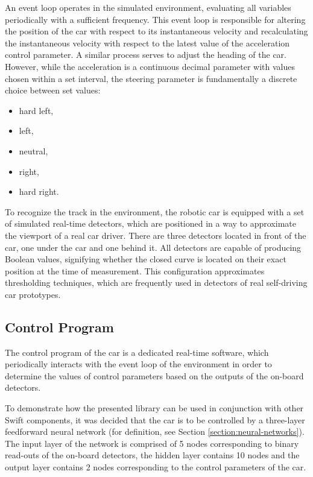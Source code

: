 An event loop operates in the simulated environment, evaluating all variables periodically with a sufficient frequency. This event loop is responsible for altering the position of the car with respect to its instantaneous velocity and recalculating the instantaneous velocity with respect to the latest value of the acceleration control parameter. A similar process serves to adjust the heading of the car. However, while the acceleration is a continuous decimal parameter with values chosen within a set interval, the steering parameter is fundamentally a discrete choice between set values:
~
\begin{itemize}
	\item hard left,
	\item left,
	\item neutral,
	\item right,
	\item hard right.
\end{itemize}

To recognize the track in the environment, the robotic car is equipped with a set of simulated real-time detectors, which are positioned in a way to approximate the viewport of a real car driver. There are three detectors located in front of the car, one under the car and one behind it. All detectors are capable of producing Boolean values, signifying whether the closed curve is located on their exact position at the time of measurement. This configuration approximates thresholding techniques, which are frequently used in detectors of real self-driving car prototypes.

\subsection{Control Program}
The control program of the car is a dedicated real-time software, which periodically interacts with the event loop of the environment in order to determine the values of control parameters based on the outputs of the on-board detectors.

To demonstrate how the presented library can be used in conjunction with other Swift components, it was decided that the car is to be controlled by a three-layer feedforward neural network (for definition, see Section \ref{section:neural-networks}). The input layer of the network is comprised of 5 nodes corresponding to binary read-outs of the on-board detectors, the hidden layer contains 10 nodes and the output layer contains 2 nodes corresponding to the control parameters of the car.

